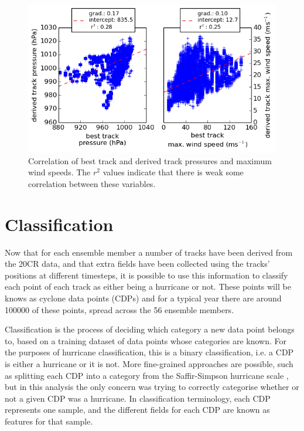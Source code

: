 \documentclass[pdftex,12pt,a4paper]{report}
\begin{document}
\begin{figure}[ht!]
    \centering
    \includegraphics[width=\textwidth]{figures/press_max_ws_corr_2005}
    \vspace{-10pt}
    \caption{Correlation of best track and derived track pressures and maximum wind speeds. The
        $r^2$ values indicate that there is weak some correlation between these variables. }
    \label{fig:press_max_ws_corr_2005}
\end{figure}

\newpage
\section{Classification}
\label{sec:classification}

Now that for each ensemble member a number of tracks have been derived from the 20CR data, and that
extra fields have been collected using the tracks' positions at different timesteps, it is possible
to use this information to classify each point of each track as either being a hurricane or not.
These points will be knows as cyclone data points (CDPs) and for a typical year there are around
\SI{100000}{} of these points, spread across the 56 ensemble members.

Classification is the process of deciding which category a new data point belongs to, based on a
training dataset of data points whose categories are known. For the purposes of hurricane
classification, this is a binary classification, i.e. a CDP is either a hurricane or it is not. More
fine-grained approaches are possible, such as splitting each CDP into a category from the
Saffir-Simpson hurricane scale \parencite{simpson1974hurricane}, but in this analysis the only
concern was trying to correctly categorise whether or not a given CDP was a hurricane. In
classification terminology, each CDP represents one sample, and the different fields for each CDP
are known as features for that sample.
\end{document}
